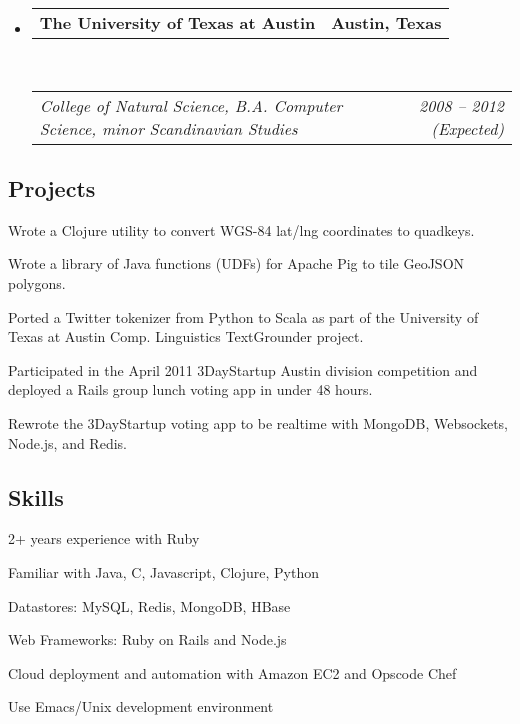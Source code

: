 \documentclass[10pt,letterpaper]{article}
\makeatletter
\newenvironment{indentsection}[1]%
{\begin{list}{}%
	{\setlength{\leftmargin}{#1}}%
	\item[]%
}
{\end{list}}
\newcommand{\headerrow}[2]
{\begin{tabular*}{\linewidth}{l@{\extracolsep{\fill}}r}
	#1 &
	#2 \\
\end{tabular*}}
\makeatother
\begin{document}
\begin{itemize}
	\parskip=0.1em

	\item 
	\headerrow
		{\textbf{The University of Texas at Austin}}
		{\textbf{Austin, Texas}}
	\\
	\headerrow
		{\emph{College of Natural Science, B.A. Computer Science, minor Scandinavian Studies}}
		{\emph{2008 -- 2012 (Expected)}}
\end{itemize}

\vspace{-0.4em}
\subsection*{Projects}

\begin{indentsection}{\parindent}
\begin{itemize*}
        \item Wrote a Clojure utility to convert WGS-84 lat/lng coordinates to quadkeys.
	\item Wrote a library of Java functions (UDFs) for Apache Pig to tile GeoJSON polygons.          
        \item Ported a Twitter tokenizer from Python to Scala as part of the University of Texas at Austin Comp. Linguistics TextGrounder project.
        \item Participated in the April 2011 3DayStartup Austin division competition and deployed a Rails group lunch voting app in under 48 hours.
        \item Rewrote the 3DayStartup voting app to be realtime with MongoDB, Websockets, Node.js, and Redis.
\end{itemize*}
\end{indentsection}

\vspace{-0.4em}
\subsection*{Skills}

\begin{indentsection}{\parindent}
\begin{itemize*}
        \item 2+ years experience with Ruby
        \item Familiar with Java, C, Javascript, Clojure, Python                    
        \item Datastores: MySQL, Redis, MongoDB, HBase
        \item Web Frameworks: Ruby on Rails and Node.js      
        \item Cloud deployment and automation with Amazon EC2 and Opscode Chef
        \item Use Emacs/Unix development environment
\end{itemize*}
\end{indentsection}
\end{document}
